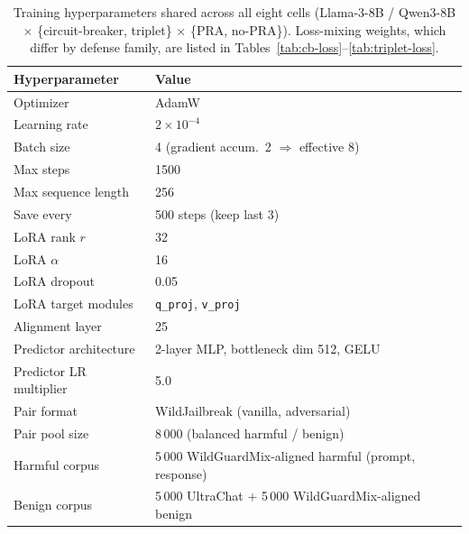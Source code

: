 %

\begin{table}[t]
  \centering
  \small
  \caption{Training hyperparameters shared across all eight cells
    (Llama-3-8B / Qwen3-8B \(\times\) \{circuit-breaker, triplet\}
    \(\times\) \{PRA, no-PRA\}).  Loss-mixing weights, which differ
    by defense family, are listed in
    Tables~\ref{tab:cb-loss}--\ref{tab:triplet-loss}.}
  \label{tab:common-train}
  \begin{tabular}{@{}l l@{}}
    \toprule
    Hyperparameter & Value \\
    \midrule
    Optimizer                          & AdamW \\
    Learning rate                      & $2\!\times\!10^{-4}$ \\
    Batch size                         & 4 (gradient accum.\ 2 $\Rightarrow$ effective 8) \\
    Max steps                          & 1500 \\
    Max sequence length                & 256 \\
    Save every                         & 500 steps (keep last 3) \\
    \midrule
    LoRA rank \(r\)                    & 32 \\
    LoRA \(\alpha\)                    & 16 \\
    LoRA dropout                       & 0.05 \\
    LoRA target modules                & \texttt{q\_proj}, \texttt{v\_proj} \\
    \midrule
    Alignment layer                    & 25 \\
    Predictor architecture             & 2-layer MLP, bottleneck dim 512, GELU \\
    Predictor LR multiplier            & 5.0 \\
    \midrule
    Pair format                        & WildJailbreak (vanilla, adversarial) \\
    Pair pool size                     & 8\,000 (balanced harmful / benign) \\
    Harmful corpus                     & 5\,000 WildGuardMix-aligned harmful (prompt, response) \\
    Benign corpus                      & 5\,000 UltraChat $+$ 5\,000 WildGuardMix-aligned benign \\
    \bottomrule
  \end{tabular}
\end{table}



